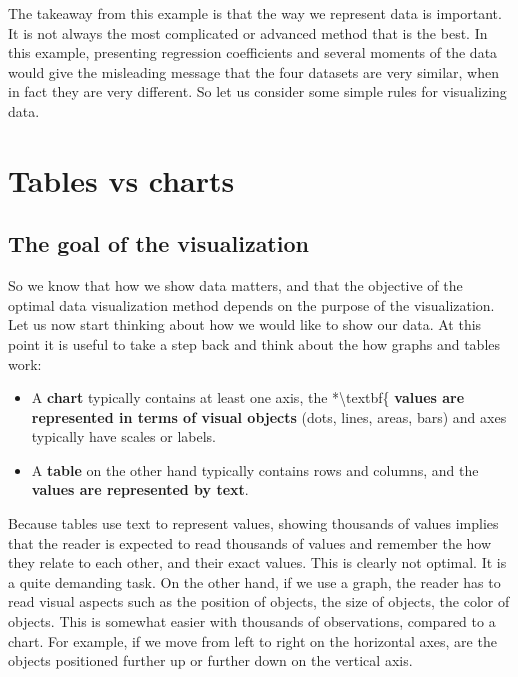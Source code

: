 \documentclass[]{book}
\providecommand{\tightlist}{%
  \setlength{\itemsep}{0pt}\setlength{\parskip}{0pt}}
\begin{document}
The takeaway from this example is that the way we represent data is important. It is not always the most complicated or advanced method that is the best. In this example, presenting regression coefficients and several moments of the data would give the misleading message that the four datasets are very similar, when in fact they are very different. So let us consider some simple rules for visualizing data.

\hypertarget{tables-vs-charts}{%
\section{Tables vs charts}\label{tables-vs-charts}}

\hypertarget{the-goal-of-the-visualization}{%
\subsection{The goal of the visualization}\label{the-goal-of-the-visualization}}

So we know that how we show data matters, and that the objective of the optimal data visualization method depends on the purpose of the visualization. Let us now start thinking about how we would like to show our data. At this point it is useful to take a step back and think about the how graphs and tables work:

\begin{itemize}
\tightlist
\item
  A \textbf{chart} typically contains at least one axis, the *\textbackslash textbf\{\textbf{ values are represented in terms of visual objects} (dots, lines, areas, bars) and axes typically have scales or labels.
\item
  A \textbf{table} on the other hand typically contains rows and columns, and the \textbf{values are represented by text}.
\end{itemize}

Because tables use text to represent values, showing thousands of values implies that the reader is expected to read thousands of values and remember the how they relate to each other, and their exact values. This is clearly not optimal. It is a quite demanding task. On the other hand, if we use a graph, the reader has to read visual aspects such as the position of objects, the size of objects, the color of objects. This is somewhat easier with thousands of observations, compared to a chart. For example, if we move from left to right on the horizontal axes, are the objects positioned further up or further down on the vertical axis.
\end{document}
